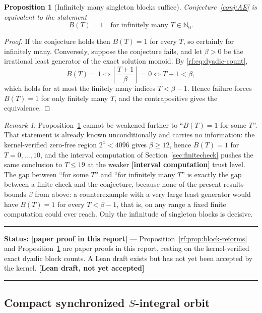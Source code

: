 \documentclass[11pt,oneside]{article}
\newtheorem{proposition}[theorem]{Proposition}
\theoremstyle{definition}
\theoremstyle{remark}
\newtheorem{remark}[theorem]{Remark}
\newcommand{\Nzero}{\mathbb N_0}
\newcommand{\lean}[1]{\texttt{\detokenize{#1}}}
\newcommand{\statusnew}{\textcolor{newgreen}{\textbf{[paper proof in this report]}}}
\newcommand{\statuscomp}{\textcolor{computeviolet}{\textbf{[interval computation]}}}
\newcommand{\statusdraft}{\textcolor{computeviolet}{\textbf{[Lean draft, not yet accepted]}}}
\newenvironment{statusbox}[1]
{\begin{center}\begin{minipage}{0.94\textwidth}\raggedright\hbadness=10000\hrule
\vspace{0.45em}\textbf{Status:} #1\par\vspace{0.35em}}
{\vspace{0.35em}\hrule\end{minipage}\end{center}}
\begin{document}
\begin{proposition}[Infinitely many singleton blocks suffice]
\label{rf:prop:infinitely-many-blocks}
Conjecture~\ref{conj:AE} is equivalent to the statement
\[
 B(T)=1\quad\text{for infinitely many }T\in\Nzero.
\]
\end{proposition}

\begin{proof}
If the conjecture holds then $B(T)=1$ for every $T$, so certainly for infinitely many.
Conversely, suppose the conjecture fails, and let $\beta>0$ be the irrational least generator
of the exact solution monoid.  By \eqref{rf:eq:dyadic-count},
\[
 B(T)=1
 \iff
 \left\lfloor\frac{T+1}{\beta}\right\rfloor=0
 \iff
 T+1<\beta ,
\]
which holds for at most the finitely many indices $T<\beta-1$.  Hence failure forces $B(T)=1$
for only finitely many $T$, and the contrapositive gives the equivalence.
\end{proof}

\begin{remark}
\label{rf:rem:not-some-T}
Proposition~\ref{rf:prop:infinitely-many-blocks} cannot be weakened further to ``$B(T)=1$ for
some $T$''.  That statement is already known unconditionally and carries no information: the
kernel-verified zero-free region $2^x<4096$ gives $\beta\ge12$, hence $B(T)=1$ for
$T=0,\dots,10$, and the interval computation of Section~\ref{sec:finitecheck} pushes the same
conclusion to $T\le19$ at the weaker \statuscomp{} trust level.  The gap between ``for some
$T$'' and ``for infinitely many $T$'' is exactly the gap between a finite check and the
conjecture, because none of the present results bounds $\beta$ from above: a counterexample
with a very large least generator would have $B(T)=1$ for every $T<\beta-1$, that is, on any
range a fixed finite computation could ever reach.  Only the infinitude of singleton blocks is
decisive.
\end{remark}

\begin{statusbox}{\statusnew{} --- Proposition~\ref{rf:prop:block-reforms} and
Proposition~\ref{rf:prop:infinitely-many-blocks} are paper proofs in this report, resting on
the kernel-verified exact dyadic block counts.  A Lean draft
\lean{BlockGrowthReformulations} exists but has not yet been accepted by the kernel.
\statusdraft}
\end{statusbox}

\subsection{Compact synchronized \texorpdfstring{$S$}{S}-integral orbit}
\end{document}
